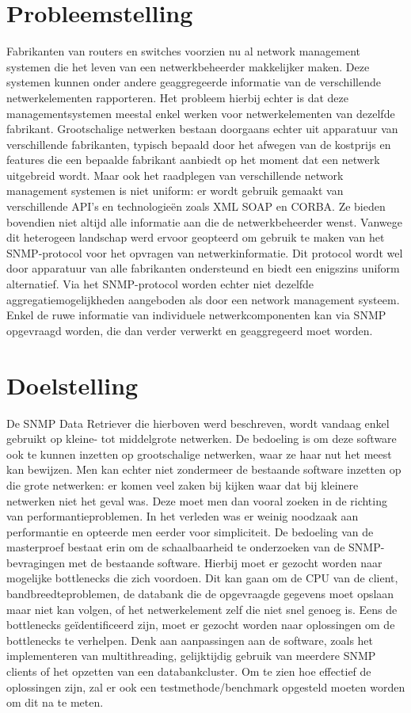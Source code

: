 \section{Probleemstelling}
Fabrikanten van routers en switches voorzien nu al network management systemen die het leven van een netwerkbeheerder makkelijker maken.
Deze systemen kunnen onder andere geaggregeerde informatie van de verschillende netwerkelementen rapporteren.
Het probleem hierbij echter is dat deze managementsystemen meestal enkel werken voor netwerkelementen van dezelfde fabrikant.
Grootschalige netwerken bestaan doorgaans echter uit apparatuur van verschillende fabrikanten,
typisch bepaald door het afwegen van de kostprijs en features die een bepaalde fabrikant aanbiedt op het moment dat een netwerk uitgebreid wordt. %
Maar ook het raadplegen van verschillende network management systemen is niet uniform:
er wordt gebruik gemaakt van verschillende API's en technologieën zoals XML SOAP en CORBA.
Ze bieden bovendien niet altijd alle informatie aan die de netwerkbeheerder wenst.
Vanwege dit heterogeen landschap werd ervoor geopteerd om gebruik te maken van het SNMP-protocol voor het opvragen van netwerkinformatie.
Dit protocol wordt wel door apparatuur van alle fabrikanten ondersteund en biedt een enigszins uniform alternatief.
Via het SNMP-protocol worden echter niet dezelfde aggregatiemogelijkheden aangeboden als door een network management systeem.
Enkel de ruwe informatie van individuele netwerkcomponenten kan via SNMP opgevraagd worden, die dan verder verwerkt en geaggregeerd moet worden.


\section{Doelstelling}
De SNMP Data Retriever die hierboven werd beschreven, wordt vandaag enkel gebruikt op kleine- tot middelgrote netwerken.
De bedoeling is om deze software ook te kunnen inzetten op grootschalige netwerken, waar ze haar nut het meest kan bewijzen.
Men kan echter niet zondermeer de bestaande software inzetten op die grote netwerken: er komen veel zaken bij kijken
waar dat bij kleinere netwerken niet het geval was. Deze moet men dan vooral zoeken in de richting van performantieproblemen.
In het verleden was er weinig noodzaak aan performantie en opteerde men eerder voor simpliciteit.
De bedoeling van de masterproef bestaat erin om de schaalbaarheid te onderzoeken van de SNMP-bevragingen met de bestaande software.
Hierbij moet er gezocht worden naar mogelijke bottlenecks die zich voordoen.
Dit kan gaan om de CPU van de client, bandbreedteproblemen, de databank die de opgevraagde gegevens moet opslaan maar niet kan volgen,
of het netwerkelement zelf die niet snel genoeg is.
Eens de bottlenecks geïdentificeerd zijn, moet er gezocht worden naar oplossingen om de bottlenecks te verhelpen.
Denk aan aanpassingen aan de software, zoals het implementeren van multithreading, gelijktijdig gebruik van meerdere SNMP clients of
het opzetten van een databankcluster.
Om te zien hoe effectief de oplossingen zijn, zal er ook een testmethode/benchmark opgesteld moeten worden om dit na te meten.

